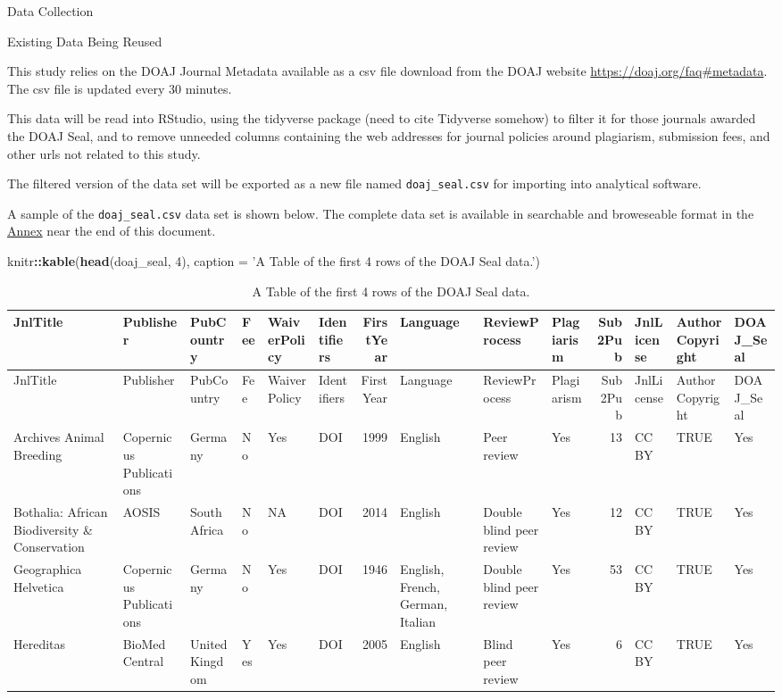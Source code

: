 \documentclass[ignorenonframetext,]{beamer}
\newenvironment{Shaded}{\begin{snugshade}}{\end{snugshade}}
\newcommand{\KeywordTok}[1]{\textcolor[rgb]{0.13,0.29,0.53}{\textbf{#1}}}
\newcommand{\DataTypeTok}[1]{\textcolor[rgb]{0.13,0.29,0.53}{#1}}
\newcommand{\DecValTok}[1]{\textcolor[rgb]{0.00,0.00,0.81}{#1}}
\newcommand{\StringTok}[1]{\textcolor[rgb]{0.31,0.60,0.02}{#1}}
\newcommand{\OperatorTok}[1]{\textcolor[rgb]{0.81,0.36,0.00}{\textbf{#1}}}
\newcommand{\NormalTok}[1]{#1}
\begin{document}
\begin{frame}[fragile]{Data Collection}

\begin{block}{Existing Data Being Reused}

This study relies on the DOAJ Journal Metadata available as a csv file
download from the DOAJ website \url{https://doaj.org/faq\#metadata}. The
csv file is updated every 30 minutes.

This data will be read into RStudio, using the tidyverse package (need
to cite Tidyverse somehow) to filter it for those journals awarded the
DOAJ Seal, and to remove unneeded columns containing the web addresses
for journal policies around plagiarism, submission fees, and other urls
not related to this study.

The filtered version of the data set will be exported as a new file
named \texttt{doaj\_seal.csv} for importing into analytical software.

A sample of the \texttt{doaj\_seal.csv} data set is shown below. The
complete data set is available in searchable and broweseable format in
the \protect\hyperlink{annex-table}{Annex} near the end of this
document.

\begin{Shaded}
\begin{Highlighting}[]
\NormalTok{knitr}\OperatorTok{::}\KeywordTok{kable}\NormalTok{(}\KeywordTok{head}\NormalTok{(doaj_seal, }\DecValTok{4}\NormalTok{), }\DataTypeTok{caption =} \StringTok{'A Table of the first 4 rows of the DOAJ Seal data.'}\NormalTok{)}
\end{Highlighting}
\end{Shaded}

\begin{longtable}[]{@{}llllllrlllrlll@{}}
\caption{A Table of the first 4 rows of the DOAJ Seal
data.}\tabularnewline
\toprule
JnlTitle & Publisher & PubCountry & Fee & WaiverPolicy & Identifiers &
FirstYear & Language & ReviewProcess & Plagiarism & Sub2Pub & JnlLicense
& AuthorCopyright & DOAJ\_Seal\tabularnewline
\midrule
\endfirsthead
\toprule
JnlTitle & Publisher & PubCountry & Fee & WaiverPolicy & Identifiers &
FirstYear & Language & ReviewProcess & Plagiarism & Sub2Pub & JnlLicense
& AuthorCopyright & DOAJ\_Seal\tabularnewline
\midrule
\endhead
Archives Animal Breeding & Copernicus Publications & Germany & No & Yes
& DOI & 1999 & English & Peer review & Yes & 13 & CC BY & TRUE &
Yes\tabularnewline
Bothalia: African Biodiversity \& Conservation & AOSIS & South Africa &
No & NA & DOI & 2014 & English & Double blind peer review & Yes & 12 &
CC BY & TRUE & Yes\tabularnewline
Geographica Helvetica & Copernicus Publications & Germany & No & Yes &
DOI & 1946 & English, French, German, Italian & Double blind peer review
& Yes & 53 & CC BY & TRUE & Yes\tabularnewline
Hereditas & BioMed Central & United Kingdom & Yes & Yes & DOI & 2005 &
English & Blind peer review & Yes & 6 & CC BY & TRUE &
Yes\tabularnewline
\bottomrule
\end{longtable}


\end{block}
\end{frame}
\end{document}
